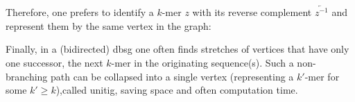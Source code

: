 \noindent Therefore, one prefers to identify a $k$-mer $z$ with its reverse complement $\overleftarrow{z^{-1}}$
and represent them by the same vertex in the graph:
\begin{bsp}
    \labsatz
\end{bsp}


\noindent Finally, in a (bidirected) \gls{dbsg} one often finds stretches of vertices that have only one successor, the next $k$-mer in the originating sequence(s).
Such a non-branching path can be collapsed into a single vertex (representing a $k'$-mer for some $k'\geq  k $),called unitig, saving space and often computation time.


